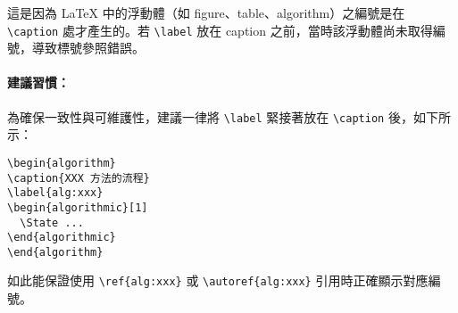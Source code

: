 這是因為 LaTeX 中的浮動體（如 figure、table、algorithm）之編號是在 \verb|\caption| 處才產生的。若 \verb|\label| 放在 caption 之前，當時該浮動體尚未取得編號，導致標號參照錯誤。

\paragraph{建議習慣：}

為確保一致性與可維護性，建議一律將 \verb|\label| 緊接著放在 \verb|\caption| 後，如下所示：

\begin{verbatim}
\begin{algorithm}
\caption{XXX 方法的流程}
\label{alg:xxx}
\begin{algorithmic}[1]
  \State ...
\end{algorithmic}
\end{algorithm}
\end{verbatim}

如此能保證使用 \verb|\ref{alg:xxx}| 或 \verb|\autoref{alg:xxx}| 引用時正確顯示對應編號。
